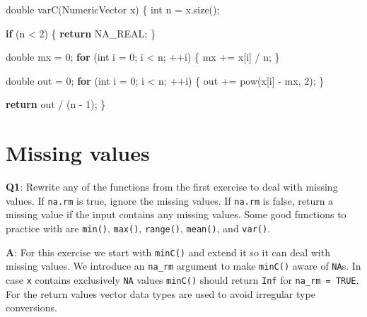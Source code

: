 \documentclass[
]{krantz}
\makeatletter
\newenvironment{Shaded}{\begin{snugshade}}{\end{snugshade}}
\newcommand{\ControlFlowTok}[1]{\textcolor[rgb]{0.13,0.29,0.53}{\textbf{#1}}}
\newcommand{\DataTypeTok}[1]{\textcolor[rgb]{0.13,0.29,0.53}{#1}}
\newcommand{\DecValTok}[1]{\textcolor[rgb]{0.00,0.00,0.81}{#1}}
\newcommand{\NormalTok}[1]{#1}
\newenvironment{kframe}{%
\medskip{}
\setlength{\fboxsep}{.8em}
 \def\at@end@of@kframe{}%
 \ifinner\ifhmode%
  \def\at@end@of@kframe{\end{minipage}}%
  \begin{minipage}{\columnwidth}%
 \fi\fi%
 \def\FrameCommand##1{\hskip\@totalleftmargin \hskip-\fboxsep
 \colorbox{shadecolor}{##1}\hskip-\fboxsep
     \hskip-\linewidth \hskip-\@totalleftmargin \hskip\columnwidth}%
 \MakeFramed {\advance\hsize-\width
   \@totalleftmargin\z@ \linewidth\hsize
   \@setminipage}}%
 {\par\unskip\endMakeFramed%
 \at@end@of@kframe}
\renewenvironment{Shaded}{\begin{kframe}}{\end{kframe}}
\renewcommand{\DataTypeTok}[1]{\textcolor[rgb]{0.56,0.13,0.00}{{#1}}}
\renewcommand{\DecValTok}  [1]{\textcolor[rgb]{0.25,0.63,0.44}{{#1}}}
\renewcommand{\NormalTok}  [1]{{#1}}
\makeatother
\begin{document}
\begin{enumerate}
\begin{Shaded}
\begin{Highlighting}[]
\DataTypeTok{double}\NormalTok{ varC(NumericVector x) \{}
  \DataTypeTok{int}\NormalTok{ n = x.size();}

  \ControlFlowTok{if}\NormalTok{ (n < }\DecValTok{2}\NormalTok{) \{}
    \ControlFlowTok{return}\NormalTok{ NA_REAL;}
\NormalTok{  \}}

  \DataTypeTok{double}\NormalTok{ mx = }\DecValTok{0}\NormalTok{;}
  \ControlFlowTok{for}\NormalTok{ (}\DataTypeTok{int}\NormalTok{ i = }\DecValTok{0}\NormalTok{; i < n; ++i) \{}
\NormalTok{    mx += x[i] / n;}
\NormalTok{  \}}

  \DataTypeTok{double}\NormalTok{ out = }\DecValTok{0}\NormalTok{;}
  \ControlFlowTok{for}\NormalTok{ (}\DataTypeTok{int}\NormalTok{ i = }\DecValTok{0}\NormalTok{; i < n; ++i) \{}
\NormalTok{    out += pow(x[i] - mx, }\DecValTok{2}\NormalTok{);}
\NormalTok{  \}}

  \ControlFlowTok{return}\NormalTok{ out / (n - }\DecValTok{1}\NormalTok{);}
\NormalTok{\}}
\end{Highlighting}
\end{Shaded}
\end{enumerate}


\hypertarget{missing-values}{%
\section{Missing values}\label{missing-values}}

\textbf{{Q1}}: Rewrite any of the functions from the first exercise to deal with missing values. If \texttt{na.rm} is true, ignore the missing values. If \texttt{na.rm} is false, return a missing value if the input contains any missing values. Some good functions to practice with are \texttt{min()}, \texttt{max()}, \texttt{range()}, \texttt{mean()}, and \texttt{var()}.

\textbf{{A}}: For this exercise we start with \texttt{minC()} and extend it so it can deal with missing values. We introduce an \texttt{na\_rm} argument to make \texttt{minC()} aware of \texttt{NA}s. In case \texttt{x} contains exclusively \texttt{NA} values \texttt{minC()} should return \texttt{Inf} for \texttt{na\_rm\ =\ TRUE}. For the return values vector data types are used to avoid irregular type conversions.
\end{document}
